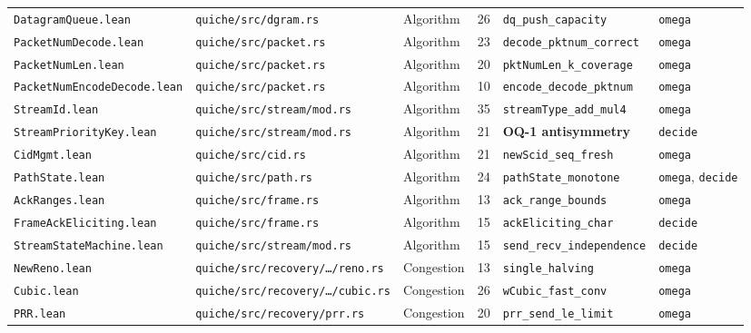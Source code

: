 \documentclass[sigconf,10pt]{acmart}
\begin{document}
\begin{table}[t]
\begin{tabular}{lllrll}
\texttt{DatagramQueue.lean}     & \texttt{quiche/src/dgram.rs}        & Algorithm & 26 & \texttt{dq\_push\_capacity}           & \texttt{omega} \\
\texttt{PacketNumDecode.lean}   & \texttt{quiche/src/packet.rs}       & Algorithm & 23 & \texttt{decode\_pktnum\_correct}      & \texttt{omega} \\
\texttt{PacketNumLen.lean}      & \texttt{quiche/src/packet.rs}       & Algorithm & 20 & \texttt{pktNumLen\_k\_coverage}       & \texttt{omega} \\
\texttt{PacketNumEncodeDecode.lean} & \texttt{quiche/src/packet.rs}   & Algorithm & 10 & \texttt{encode\_decode\_pktnum}        & \texttt{omega} \\
\texttt{StreamId.lean}          & \texttt{quiche/src/stream/mod.rs}   & Algorithm & 35 & \texttt{streamType\_add\_mul4}        & \texttt{omega} \\
\texttt{StreamPriorityKey.lean} & \texttt{quiche/src/stream/mod.rs}   & Algorithm & 21 & \textbf{OQ-1 antisymmetry}            & \texttt{decide} \\
\texttt{CidMgmt.lean}           & \texttt{quiche/src/cid.rs}          & Algorithm & 21 & \texttt{newScid\_seq\_fresh}           & \texttt{omega} \\
\texttt{PathState.lean}         & \texttt{quiche/src/path.rs}         & Algorithm & 24 & \texttt{pathState\_monotone}          & \texttt{omega}, \texttt{decide} \\
\texttt{AckRanges.lean}         & \texttt{quiche/src/frame.rs}        & Algorithm & 13 & \texttt{ack\_range\_bounds}           & \texttt{omega} \\
\texttt{FrameAckEliciting.lean} & \texttt{quiche/src/frame.rs}        & Algorithm & 15 & \texttt{ackEliciting\_char}           & \texttt{decide} \\
\texttt{StreamStateMachine.lean}& \texttt{quiche/src/stream/mod.rs}   & Algorithm & 15 & \texttt{send\_recv\_independence}     & \texttt{decide} \\
\midrule
\texttt{NewReno.lean}           & \texttt{quiche/src/recovery/\ldots/reno.rs}   & Congestion & 13 & \texttt{single\_halving}        & \texttt{omega} \\
\texttt{Cubic.lean}             & \texttt{quiche/src/recovery/\ldots/cubic.rs}  & Congestion & 26 & \texttt{wCubic\_fast\_conv}     & \texttt{omega} \\
\texttt{PRR.lean}               & \texttt{quiche/src/recovery/prr.rs}           & Congestion & 20 & \texttt{prr\_send\_le\_limit}   & \texttt{omega} \\

\end{tabular}
\end{table}
\end{document}
